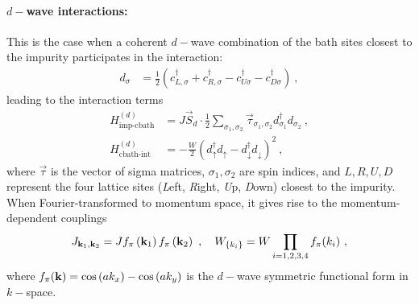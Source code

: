 \documentclass[reprint,hidelinks,onecolumn]{revtex4-2}
\begin{document}
\paragraph{\(d-\)wave interactions:} This is the case when a coherent \(d-\)wave combination of the bath sites closest to the impurity participates in the interaction:
\begin{equation}\begin{aligned}
	d_{\sigma} &= \frac{1}{2}\left(c^\dagger_{L,\sigma} + c^\dagger_{R,\sigma} - c^\dagger_{U\sigma} - c^\dagger_{D\sigma}\right)~,
\end{aligned}\end{equation}
leading to the interaction terms
\begin{equation}\begin{aligned}
	H^{(d)}_\text{imp-cbath} &= J\vec{S}_d\cdot\frac{1}{2}\sum_{\sigma_1,\sigma_2}\vec{\tau}_{\sigma_1,\sigma_2} d^\dagger_{\sigma_1}d_{\sigma_2}~,\\
	H^{(d)}_\text{cbath-int} &= -\frac{W}{2}\left(d^\dagger_{\uparrow}d_{\uparrow} - d^\dagger_{\downarrow}d_{\downarrow}\right)^2~,
\end{aligned}\end{equation}
where \(\vec \tau\) is the vector of sigma matrices, \(\sigma_1,\sigma_2\) are spin indices, and \(L,R,U,D\) represent the four lattice sites ({\it L}eft, {\it R}ight, {\it U}p, {\it D}own) closest to the impurity. When Fourier-transformed to momentum space, it gives rise to the momentum-dependent couplings
\begin{equation}\begin{aligned}\label{d-wave k-space}
	J_{{\bf k}_1, {\bf k}_2} = J f_{\pi}\left({\bf k}_1\right) f_{\pi}\left({\bf k}_2\right) ~,\quad W_{\left\{ k_i \right\} } = W\prod_{i=1,2,3,4}f_{\pi}(k_i)~,
\end{aligned}\end{equation}
where \(f_{\pi}({\bf k}) = \cos\left( ak_x \right) - \cos\left( ak_y \right) \) is the \(d-\)wave symmetric functional form in \(k-\)space.
\end{document}

